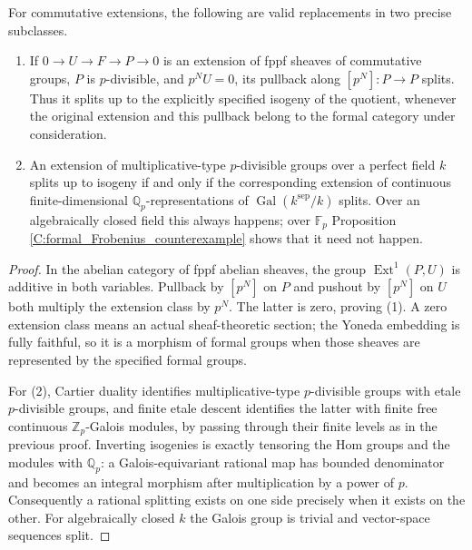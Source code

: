 \begin{proposition}
\label{C:formal_corrected}
For commutative extensions, the following are valid replacements in two
precise subclasses.
\begin{enumerate}
\item If $0\to U\to F\to P\to0$ is an extension of fppf sheaves of
commutative groups, $P$ is $p$-divisible, and $p^NU=0$, its pullback along
$[p^N]:P\to P$ splits. Thus it splits up to the explicitly specified
isogeny of the quotient, whenever the original extension and this pullback
belong to the formal category under consideration.
\item An extension of multiplicative-type $p$-divisible groups over a
perfect field $k$ splits up to isogeny if and only if the corresponding
extension of continuous finite-dimensional $\mathbb Q_p$-representations
of $\operatorname{Gal}(k^{\mathrm{sep}}/k)$ splits. Over an algebraically
closed field this always happens; over $\mathbb F_p$ Proposition
\ref{C:formal_Frobenius_counterexample} shows that it need not happen.
\end{enumerate}
\end{proposition}
\begin{proof}
In the abelian category of fppf abelian sheaves, the group
$\operatorname{Ext}^1(P,U)$ is additive in both variables. Pullback by
$[p^N]$ on $P$ and pushout by $[p^N]$ on $U$ both multiply the extension
class by $p^N$. The latter is zero, proving (1). A zero extension class
means an actual sheaf-theoretic section; the Yoneda embedding is fully
faithful, so it is a morphism of formal groups when those sheaves are
represented by the specified formal groups.

For (2), Cartier duality identifies multiplicative-type $p$-divisible
groups with etale $p$-divisible groups, and finite etale descent identifies
the latter with finite free continuous $\mathbb Z_p$-Galois modules, by
passing through their finite levels as in the previous proof. Inverting
isogenies is exactly tensoring the Hom groups and the modules with
$\mathbb Q_p$: a Galois-equivariant rational map has bounded denominator
and becomes an integral morphism after multiplication by a power of $p$.
Consequently a rational splitting exists on one side precisely when it
exists on the other. For algebraically closed $k$ the Galois group is
trivial and vector-space sequences split.
\end{proof}
